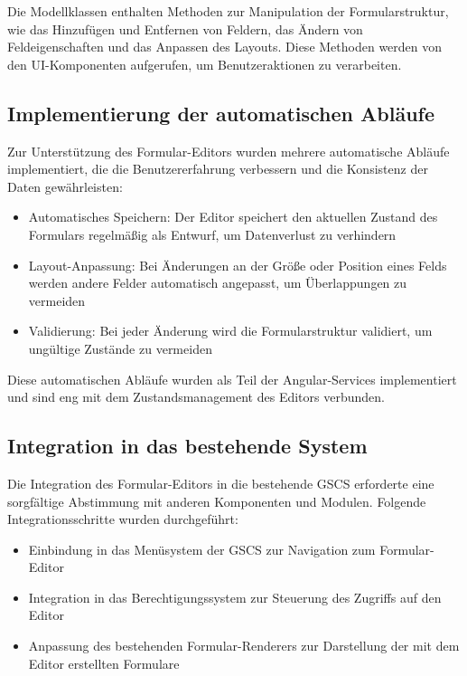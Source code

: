 \documentclass[a4paper,11pt]{article}
\begin{document}
\noindent Die Modellklassen enthalten Methoden zur Manipulation der Formularstruktur, wie das Hinzufügen und Entfernen von Feldern, das Ändern von Feldeigenschaften und das Anpassen des Layouts. Diese Methoden werden von den UI-Komponenten aufgerufen, um Benutzeraktionen zu verarbeiten.


\subsection{Implementierung der automatischen Abläufe}
Zur Unterstützung des Formular-Editors wurden mehrere automatische Abläufe implementiert, die die Benutzererfahrung verbessern und die Konsistenz der Daten gewährleisten:

\begin{itemize}
  \item Automatisches Speichern: Der Editor speichert den aktuellen Zustand des Formulars regelmäßig als Entwurf, um Datenverlust zu verhindern
  \item Layout-Anpassung: Bei Änderungen an der Größe oder Position eines Felds werden andere Felder automatisch angepasst, um Überlappungen zu vermeiden
  \item Validierung: Bei jeder Änderung wird die Formularstruktur validiert, um ungültige Zustände zu vermeiden
\end{itemize}

\noindent Diese automatischen Abläufe wurden als Teil der Angular-Services implementiert und sind eng mit dem Zustandsmanagement des Editors verbunden.

\subsection{Integration in das bestehende System}
Die Integration des Formular-Editors in die bestehende GSCS erforderte eine sorgfältige Abstimmung mit anderen Komponenten und Modulen. Folgende Integrationsschritte wurden durchgeführt:

\begin{itemize}
  \item Einbindung in das Menüsystem der GSCS zur Navigation zum Formular-Editor
  \item Integration in das Berechtigungssystem zur Steuerung des Zugriffs auf den Editor
  \item Anpassung des bestehenden Formular-Renderers zur Darstellung der mit dem Editor erstellten Formulare
\end{itemize}
\end{document}
